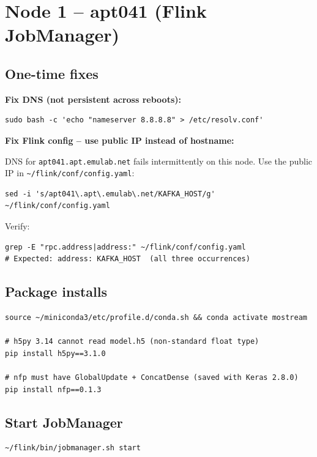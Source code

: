 \documentclass[11pt,a4paper]{article}
\begin{document}
\section{Node 1 -- apt041 (Flink JobManager)}

\subsection{One-time fixes}

\textbf{Fix DNS (not persistent across reboots):}
\begin{lstlisting}
sudo bash -c 'echo "nameserver 8.8.8.8" > /etc/resolv.conf'
\end{lstlisting}

\textbf{Fix Flink config -- use public IP instead of hostname:}

DNS for \texttt{apt041.apt.emulab.net} fails intermittently on this node. Use the public IP
in \texttt{\textasciitilde/flink/conf/config.yaml}:
\begin{lstlisting}
sed -i 's/apt041\.apt\.emulab\.net/KAFKA_HOST/g' ~/flink/conf/config.yaml
\end{lstlisting}

Verify:
\begin{lstlisting}
grep -E "rpc.address|address:" ~/flink/conf/config.yaml
# Expected: address: KAFKA_HOST  (all three occurrences)
\end{lstlisting}

\subsection{Package installs}
\begin{lstlisting}
source ~/miniconda3/etc/profile.d/conda.sh && conda activate mostream

# h5py 3.14 cannot read model.h5 (non-standard float type)
pip install h5py==3.1.0

# nfp must have GlobalUpdate + ConcatDense (saved with Keras 2.8.0)
pip install nfp==0.1.3
\end{lstlisting}

\subsection{Start JobManager}
\begin{lstlisting}
~/flink/bin/jobmanager.sh start
\end{lstlisting}
\end{document}
